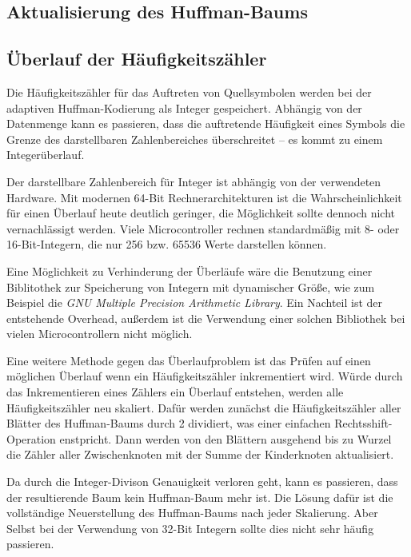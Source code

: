 \documentclass[twoside,11pt,a4paper]{article}
\theoremstyle{break}
\begin{document}
\subsection{Aktualisierung des Huffman-Baums}


\subsection{Überlauf der Häufigkeitszähler}

Die Häufigkeitszähler für das Auftreten von Quellsymbolen werden bei der
adaptiven Huffman-Kodierung als Integer gespeichert. Abhängig von der Datenmenge
kann es passieren, dass die auftretende Häufigkeit eines Symbols die Grenze des
darstellbaren Zahlenbereiches überschreitet -- es kommt zu einem
Integerüberlauf.

Der darstellbare Zahlenbereich für Integer ist abhängig von der verwendeten
Hardware. Mit modernen 64-Bit Rechnerarchitekturen ist die Wahrscheinlichkeit
für einen Überlauf heute deutlich geringer, die Möglichkeit sollte dennoch nicht
vernachlässigt werden. Viele Microcontroller rechnen standardmäßig mit 8- oder
16-Bit-Integern, die nur 256 bzw. 65536 Werte darstellen können.

Eine Möglichkeit zu Verhinderung der Überläufe wäre die Benutzung einer
Biblitothek zur Speicherung von Integern mit dynamischer Größe, wie zum Beispiel
die \emph{GNU Multiple Precision Arithmetic Library}\cite{GMP}. Ein Nachteil ist
der entstehende Overhead, außerdem ist die Verwendung einer solchen Bibliothek
bei vielen Microcontrollern nicht möglich.

Eine weitere Methode gegen das Überlaufproblem ist das Prüfen auf einen
möglichen Überlauf wenn ein Häufigkeitszähler inkrementiert wird. Würde durch
das Inkrementieren eines Zählers ein Überlauf entstehen, werden alle
Häufigkeitszähler neu skaliert. Dafür werden zunächst die Häufigkeitszähler
aller Blätter des Huffman-Baums durch 2 dividiert, was einer einfachen
Rechtsshift-Operation enstpricht. Dann werden von den Blättern ausgehend bis zu
Wurzel die Zähler aller Zwischenknoten mit der Summe der Kinderknoten
aktualisiert.

Da durch die Integer-Divison Genauigkeit verloren geht, kann es passieren, dass
der resultierende Baum kein Huffman-Baum mehr ist. Die Lösung dafür ist die
vollständige Neuerstellung des Huffman-Baums nach jeder Skalierung. Aber Selbst
bei der Verwendung von 32-Bit Integern sollte dies nicht sehr häufig passieren.
\end{document}

